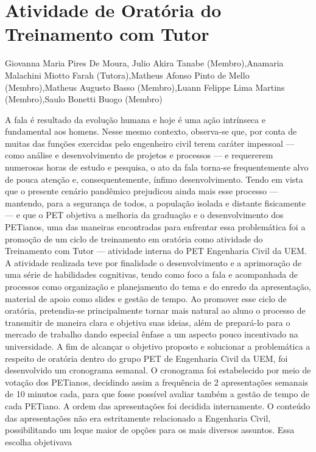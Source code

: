 \section{Atividade de Oratória do Treinamento com Tutor}

Giovanna Maria Pires De Moura, Julio Akira Tanabe (Membro),Anamaria Malachini Miotto Farah (Tutora),Matheus Afonso Pinto de Mello (Membro),Matheus Augusto Basso (Membro),Luann Felippe Lima Martins (Membro),Saulo Bonetti Buogo (Membro)

A fala é resultado da evolução humana e hoje é uma ação intrínseca e fundamental aos 
homens. Nesse mesmo contexto, observa-se que, por conta de muitas das funções exercidas pelo 
engenheiro civil terem caráter impessoal — como análise e desenvolvimento de projetos e 
processos — e requererem numerosas horas de estudo e pesquisa, o ato da fala torna-se 
frequentemente alvo de pouca atenção e, consequentemente, ínfimo desenvolvimento. Tendo em 
vista que o presente cenário pandêmico prejudicou ainda mais esse processo — mantendo, para a 
segurança de todos, a população isolada e distante fisicamente — e que o PET objetiva a melhoria 
da graduação e o desenvolvimento dos PETianos, uma das maneiras encontradas para enfrentar 
essa problemática foi a promoção de um ciclo de treinamento em oratória como atividade do 
Treinamento com Tutor — atividade interna do PET Engenharia Civil da UEM. 
A atividade realizada teve por finalidade o desenvolvimento e a aprimoração de uma série 
de habilidades cognitivas, tendo como foco a fala e acompanhada de processos como organização 
e planejamento do tema e do enredo da apresentação, material de apoio como slides e gestão de 
tempo. Ao promover esse ciclo de oratória, pretendia-se principalmente tornar mais natural ao 
aluno o processo de transmitir de maneira clara e objetiva suas ideias, além de prepará-lo para o 
mercado de trabalho dando especial ênfase a um aspecto pouco incentivado na universidade.
A fim de alcançar o objetivo proposto e solucionar a problemática a respeito de oratória 
dentro do grupo PET de Engenharia Civil da UEM, foi desenvolvido um cronograma semanal. O 
cronograma foi estabelecido por meio de votação dos PETianos, decidindo assim a frequência de 
2 apresentações semanais de 10 minutos cada, para que fosse possível avaliar também a gestão de 
tempo de cada PETiano. A ordem das apresentações foi decidida internamente.
O conteúdo das apresentações não era estritamente relacionado a Engenharia Civil, 
possibilitando um leque maior de opções para os mais diversos assuntos. Essa escolha objetivava 
